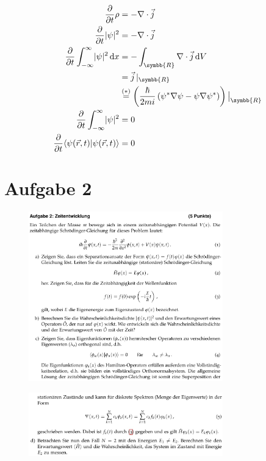     \begin{align*}
        \frac{\partial}{\partial t} \rho &= -\nabla \cdot \vec{j}\\
        \frac{\partial}{\partial t} \abs{\psi}^2 &= - \nabla \cdot \vec{j}\\
        \frac{\partial}{\partial t} \int_{-\infty}^{\infty}  \abs{\psi}^2 \,\mathrm{d}x &= -\int_{\symbb{R}} \nabla \cdot \vec{j} \,\mathrm{d}V\\
        &= \vec{j}\, \vert_{\symbb{R}}\\
        &\stackrel{(*)}{=} \left( \frac{\hbar}{2mi} \left( \psi^* \nabla \psi - \psi \nabla \psi^*   \right) \right) \big| _{\symbb{R}}\\
        \frac{\partial}{\partial t} \int_{-\infty}^{\infty} \abs{\psi}^2 &= 0\\
        \frac{\partial}{\partial t} \langle \psi(\vec{r}, t) \vert \psi(\vec{r}, t) \rangle &= 0
    \end{align*}
  
\section{Aufgabe 2}

\begin{figure}[H]
    \centering
    \includegraphics[width=0.75\textwidth]{./images/Aufgabe2abc.jpg}
    \label{fig:2}
\end{figure}

\begin{figure}[H]
    \centering
    \includegraphics[width=0.75\textwidth]{./images/Aufgabe2d.jpg}
    \label{fig:3}
\end{figure}

